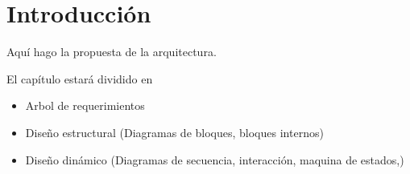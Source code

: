 \section{Introducción}
Aquí hago la propuesta de la arquitectura.

El capítulo estará dividido en

\begin{itemize}
\item Arbol de requerimientos
\item Diseño estructural (Diagramas de bloques, bloques internos)
\item Diseño dinámico (Diagramas de secuencia, interacción, maquina de estados,)
  
\end{itemize}
